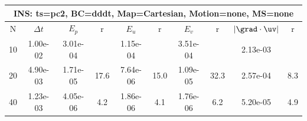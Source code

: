 
\begin{tabular}{|c|c|c|c|c|c|c|c|c|c|} \hline
 \multicolumn{10}{|c|}{INS: ts=pc2, BC=dddt, Map=Cartesian, Motion=none, MS=none } \\ \hline 
     N  &   $\Delta t$ & $E_p$   &  r  &   $E_u$   &   r    &   $E_v$   & r   &  $|\grad\cdot\uv|$  & r   \\ \hline 
  10   &  1.00e-02  &   3.01e-04  &        &   1.15e-04  &        &   3.51e-04  &        &   2.13e-03  &        \\ 
  20   &  4.90e-03  &   1.71e-05  & 17.6  &   7.64e-06  & 15.0  &   1.09e-05  & 32.3  &   2.57e-04  & 8.3  \\ 
  40   &  1.23e-03  &   4.05e-06  & 4.2  &   1.86e-06  & 4.1  &   1.76e-06  & 6.2  &   5.20e-05  & 4.9  \\ 
 \hline 
\end{tabular}
